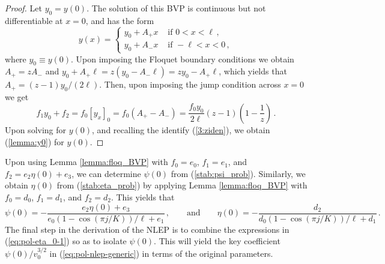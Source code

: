 \documentclass{article}%
\begin{document}
\begin{proof}
Let $y_{0}=y(0)$. The solution of this BVP is continuous but
not differentiable at $x=0$, and has the form
\[
y(x)=\begin{cases}
y_{0}+A_{+}x & \mbox{ if }0<x<\ell\,, \\
y_{0}+A_{-}x & \mbox{ if }-\ell<x<0\,,
\end{cases}
\]
where $y_0\equiv y(0)$.  Upon imposing the Floquet boundary conditions
we obtain $A_{+}=zA_{-}$ and
$y_{0}+A_{+}\ell=z\left(y_0-A_{-}\ell\right)= zy_{0}-A_{+}\ell$, which
yields that $A_{+}={(z-1)y_{0}/(2\ell)}$. Then, upon imposing the
jump condition across $x=0$ we get
\begin{equation*}
f_{1} y_0 +f_{2}  =  f_{0}\left[y_{x}\right]_{0} = f_{0}
 \left(A_{+}-A_{-}\right) = \frac{f_{0}y_{0}}{2\ell}
 \left(z-1\right)\left(1-\frac{1}{z}\right) \,.
\end{equation*}
Upon solving for $y(0)$, and recalling the identify (\ref{3:ziden}),
we obtain (\ref{lemma:y0}) for $y(0)$.
\end{proof}

Upon using Lemma \ref{lemma:floq_BVP} with $f_0=e_0$, $f_1=e_1$, and
$f_2=e_2\eta(0)+e_3$, we can determine $\psi(0)$ from
(\ref{stab:psi_prob}).  Similarly, we obtain $\eta(0)$ from
(\ref{stab:eta_prob}) by applying Lemma \ref{lemma:floq_BVP} with
$f_0=d_0$, $f_1=d_1$, and $f_2=d_2$. This yields that
\begin{equation}
\psi(0)=-\frac{e_{2}\eta(0)+e_{3}}{e_{0}
{\left(1-\cos(\pi j/K)\right)/\ell}+e_{1}}\,, \qquad \mbox{and} \qquad
\eta(0)=-\frac{d_{2}}{d_{0}{\left(1-\cos(\pi j/K)\right)/\ell} +
d_{1}}\,. \label{eq:pol-eta_0-1}
\end{equation}
The final step in the derivation of the NLEP is to combine the expressions
in  (\ref{eq:pol-eta_0-1}) so as to isolate $\psi(0)$. This will yield
the key coefficient ${\psi(0)/v_{0}^{3/2}}$ in 
(\ref{eq:pol-nlep-generic}) in terms of the original parameters.
\end{document}
